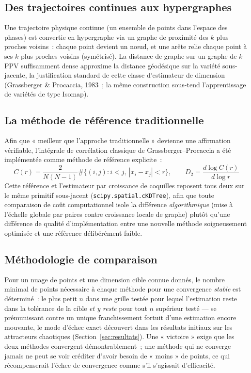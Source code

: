\documentclass[11pt,a4paper]{article}
\begin{document}
\subsection{Des trajectoires continues aux hypergraphes}

Une trajectoire physique continue (un ensemble de points dans l'espace des
phases) est convertie en hypergraphe via un graphe de proximité des $k$
plus proches voisins~: chaque point devient un nœud, et une arête relie
chaque point à ses $k$ plus proches voisins (symétrisé). La distance de
graphe sur un graphe de $k$-PPV suffisamment dense approxime la distance
géodésique sur la variété sous-jacente, la justification standard de cette
classe d'estimateur de dimension (Grassberger \& Procaccia, 1983~; la même
construction sous-tend l'apprentissage de variétés de type Isomap).

\subsection{La méthode de référence traditionnelle}

Afin que « meilleur que l'approche traditionnelle » devienne une
affirmation vérifiable, l'intégrale de corrélation classique de
Grassberger--Procaccia a été implémentée comme méthode de référence
explicite~:
\[
C(r) = \frac{2}{N(N-1)} \#\{(i,j) : i<j,\ |x_i - x_j| < r\}, \qquad
D_2 = \frac{d \log C(r)}{d \log r}
\]
Cette référence et l'estimateur par croissance de coquilles reposent tous
deux sur le même primitif sous-jacent (\texttt{scipy.spatial.cKDTree}),
afin que toute comparaison de coût computationnel isole la différence
\emph{algorithmique} (mise à l'échelle globale par paires contre
croissance locale de graphe) plutôt qu'une différence de qualité
d'implémentation entre une nouvelle méthode soigneusement optimisée et une
référence délibérément faible.

\subsection{Méthodologie de comparaison}

Pour un nuage de points et une dimension cible connue donnés, le nombre
minimal de points nécessaire à chaque méthode pour une convergence
\emph{stable} est déterminé~: le plus petit $n$ dans une grille testée pour
lequel l'estimation reste dans la tolérance de la cible \emph{et y reste}
pour tout $n$ supérieur testé --- se prémunissant contre un unique
franchissement fortuit d'une estimation encore mouvante, le mode d'échec
exact découvert dans les résultats initiaux sur les attracteurs chaotiques
(Section~\ref{sec:resultats}). Une « victoire » exige que les deux
méthodes convergent démontrablement~; une méthode qui ne converge jamais
ne peut se voir créditer d'avoir besoin de « moins » de points, ce qui
récompenserait l'échec de convergence comme s'il s'agissait d'efficacité.
\end{document}
